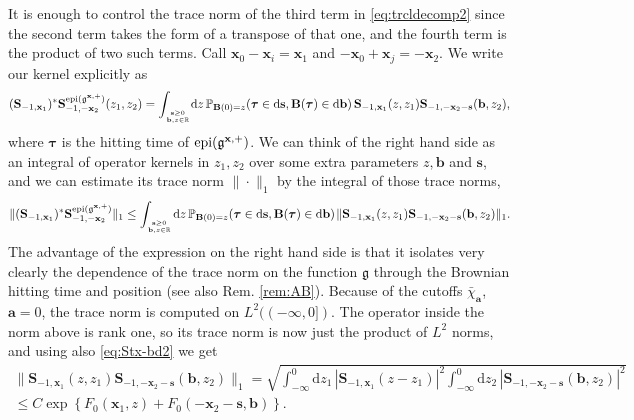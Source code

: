 \documentclass[letterpaper,reqno,11pt,oneside,final]{amsart}
\theoremstyle{definition}
\newcommand{\fg}{\mathfrak{g}}
\newcommand{\fb}{\mathbf{b}}
\newcommand{\pp}{\mathbb{P}}
\newcommand{\rr}{\mathbb{R}}
\newcommand{\ts}{\hspace{0.1em}}
\newcommand{\tsm}{\hspace{-0.1em}}
\newcommand{\uptext}[1]{\text{\upshape{#1}}}
\DeclareMathOperator{\epi}{\uptext{epi}}
\renewcommand{\d}{\mathrm{d}}
\newcommand{\fT}{\mathbf{S}}
\newcommand{\fs}{\mathbf{s}}
\newcommand{\fx}{\mathbf{x}}
\newcommand{\fa}{\mathbf{a}}
\newcommand{\fB}{\mathbf{B}}
\newcommand{\ftau}{\bm{\tau}}
\numberwithin{equation}{section}
\begin{document}
It is enough to control the trace norm of the third term in \eqref{eq:trcldecomp2} since the second term takes the form of a transpose of that one, and the fourth term is the product of two such terms.
Call $\fx_0-\fx_i=\fx_1$ and $-\fx_0+\fx_j=-\fx_2$.
We write our kernel explicitly as
\begin{align}\label{eq:A1}
(\fT_{-1,\fx_1} )^* \fT^{\epi(\fg^{\fx,+})}_{-1,-\fx_2}(z_1,z_2) 
=\int_{\fs\geq0\atop\fb,z\in\rr}\!\d z\,\pp_{\fB(0)=z}(\ftau\in\d\fs,\fB(\ftau)\in\d\fb)\,\fT_{-1,\fx_1}(z,z_1)\fT_{-1,-\fx_2-\fs}(\fb,z_2),
\end{align}
where $\ftau$ is the hitting time of $\epi(\fg^{\fx,+})$.
We can think of the right hand side as an integral of operator kernels in $z_1,z_2$ over some extra parameters $z,\fb$ and $\fs$, and we can estimate its trace norm $\|\cdot\|_1$ by the integral of those trace norms,
\begin{equation}\label{eq:A2}
  \|( \fT_{-1,\fx_1} )^* \fT^{\epi(\fg^{\fx,+})}_{-1,-\fx_2}\|_1
\le \int_{\fs\geq0\atop\fb,z\in\rr}\tsm\d z\,\pp_{\fB(0)=z}(\ftau\in\d\fs,\fB(\ftau)\in\d\fb)\ts\|\fT_{-1,\fx_1}(z,z_1)\fT_{-1,-\fx_2-\fs}(\fb,z_2)\|_1.
\end{equation}
The advantage of the expression on the right hand side is that it isolates very clearly the dependence of the trace norm on the function $\fg$ through the Brownian hitting time and position (see also Rem. \ref{rem:AB}).
Because of the cutoffs $\bar\chi_\fa$, $\fa=0$, the trace norm is computed on $L^2((-\infty,0])$.
The operator inside the norm above is rank one, so its trace norm is now just the product of $L^2$ norms, and using also \eqref{eq:Stx-bd2} we get
\begin{multline}\label{eq:A3}
\|\fT_{-1,\fx_1}(z,z_1)\fT_{-1,-\fx_2-\fs}(\fb,z_2)\|_1 = \sqrt{\int_{-\infty}^0\d z_1\,|\fT_{-1,\fx_1}(z-z_1)|^2
\int_{-\infty}^0\d z_2\,|\fT_{-1,-\fx_2-\fs}(\fb,z_2)|^2}\\
\le C \exp \left\{ {F}_0(\fx_1 ,z)+ {F}_0(-\fx_2-\fs ,\fb)\right\}.
\end{multline}
\end{document}
